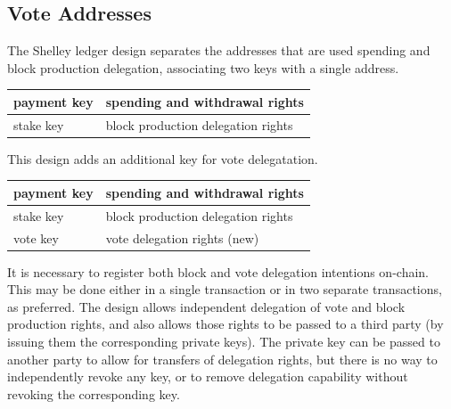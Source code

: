 \subsection{Vote Addresses}

The Shelley ledger design separates the addresses that are used spending and block production delegation, associating two keys with a single address.

\begin{center}
  \begin{tabular}{||l|l||}
\hline\hline
  payment key & spending and withdrawal rights \\\hline
  stake key & block production delegation rights \\\hline
  \hline\hline
  \end{tabular}
\end{center}

This design adds an additional key for vote delegatation.

\begin{center}
  \begin{tabular}{||l|l||}
\hline\hline
  payment key & spending and withdrawal rights \\\hline
  stake key & block production delegation rights \\\hline
  vote key & vote delegation rights (new) \\
\hline\hline
\end{tabular}
\end{center}

It is necessary to register both block and vote delegation intentions on-chain.  This may be done either in a single transaction or in two separate transactions,
as preferred.  The design allows independent delegation of vote and block production rights,
and also allows those rights to be passed to a third party (by issuing them the corresponding private keys).  
The private key can be passed to another party to allow for transfers of delegation rights, but there is no way to independently revoke any key, or to remove
delegation capability without revoking the corresponding key.  

